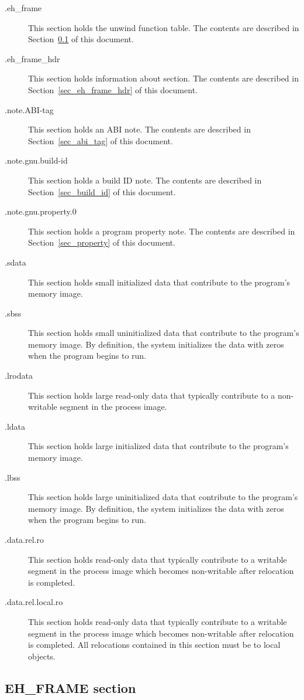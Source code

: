 \begin{description}
 \item[.eh_frame] This section holds the unwind function table.  The
   contents are described in Section~\ref{sec_eh_frame} of this document.
 \item[.eh_frame_hdr] This section holds information about
    section. The contents are described in
   Section~\ref{sec_eh_frame_hdr} of this document.
 \item[.note.ABI-tag] This section holds an ABI  note.  The contents are
   described in Section~\ref{sec_abi_tag} of this document.
 \item[.note.gnu.build-id] This section holds a build ID note.  The
   contents are described in Section~\ref{sec_build_id} of this document.
 \item[.note.gnu.property.0] This section holds a program property note.
   The contents are described in Section~\ref{sec_property} of this
   document.
 \item[.sdata] This section holds small initialized data that
   contribute to the program's memory image.
 \item[.sbss] This section holds small uninitialized data that
   contribute to the program's memory image.  By definition, the system
   initializes the data with zeros when the program begins to run.
 \item[.lrodata] This section holds large read-only data that typically
   contribute to a non-writable segment in the process image.
 \item[.ldata] This section holds large initialized data that
   contribute to the program's memory image.
 \item[.lbss] This section holds large uninitialized data that
   contribute to the program's memory image.  By definition, the system
   initializes the data with zeros when the program begins to run.
 \item[.data.rel.ro] This section holds read-only data that typically
   contribute to a writable segment in the process image which becomes
   non-writable after relocation is completed.
 \item[.data.rel.local.ro] This section holds read-only data that
   typically contribute to a writable segment in the process image
   which becomes non-writable after relocation is completed.  All
   relocations contained in this section must be to local objects.
\end{description}

\subsection{EH\_FRAME section}
\label{sec_eh_frame}


